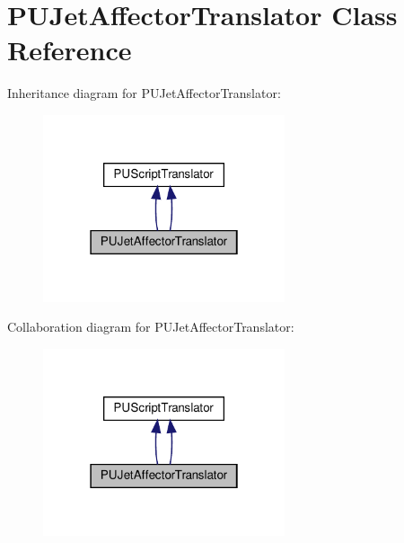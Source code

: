 \hypertarget{classPUJetAffectorTranslator}{}\section{P\+U\+Jet\+Affector\+Translator Class Reference}
\label{classPUJetAffectorTranslator}


Inheritance diagram for P\+U\+Jet\+Affector\+Translator\+:
\nopagebreak
\begin{figure}[H]
\begin{center}
\leavevmode
\includegraphics[width=202pt]{classPUJetAffectorTranslator__inherit__graph}
\end{center}
\end{figure}


Collaboration diagram for P\+U\+Jet\+Affector\+Translator\+:
\nopagebreak
\begin{figure}[H]
\begin{center}
\leavevmode
\includegraphics[width=202pt]{classPUJetAffectorTranslator__coll__graph}
\end{center}
\end{figure}
